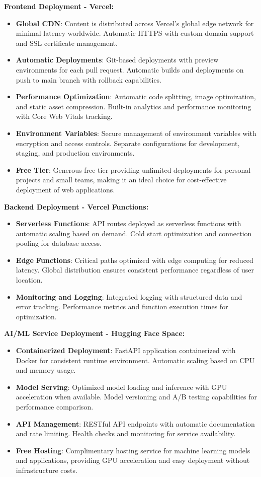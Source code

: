 \documentclass[12pt,a4paper]{article}
\begin{document}
\textbf{Frontend Deployment - Vercel:}
\begin{itemize}
  \item \textbf{Global CDN}: Content is distributed across Vercel's global edge network for minimal latency worldwide. Automatic HTTPS with custom domain support and SSL certificate management.
  \item \textbf{Automatic Deployments}: Git-based deployments with preview environments for each pull request. Automatic builds and deployments on push to main branch with rollback capabilities.
  \item \textbf{Performance Optimization}: Automatic code splitting, image optimization, and static asset compression. Built-in analytics and performance monitoring with Core Web Vitals tracking.
  \item \textbf{Environment Variables}: Secure management of environment variables with encryption and access controls. Separate configurations for development, staging, and production environments.
  \item \textbf{Free Tier}: Generous free tier providing unlimited deployments for personal projects and small teams, making it an ideal choice for cost-effective deployment of web applications.
\end{itemize}

\textbf{Backend Deployment - Vercel Functions:}
\begin{itemize}
  \item \textbf{Serverless Functions}: API routes deployed as serverless functions with automatic scaling based on demand. Cold start optimization and connection pooling for database access.
  \item \textbf{Edge Functions}: Critical paths optimized with edge computing for reduced latency. Global distribution ensures consistent performance regardless of user location.
  \item \textbf{Monitoring and Logging}: Integrated logging with structured data and error tracking. Performance metrics and function execution times for optimization.
\end{itemize}

\textbf{AI/ML Service Deployment - Hugging Face Space:}
\begin{itemize}
  \item \textbf{Containerized Deployment}: FastAPI application containerized with Docker for consistent runtime environment. Automatic scaling based on CPU and memory usage.
  \item \textbf{Model Serving}: Optimized model loading and inference with GPU acceleration when available. Model versioning and A/B testing capabilities for performance comparison.
  \item \textbf{API Management}: RESTful API endpoints with automatic documentation and rate limiting. Health checks and monitoring for service availability.
  \item \textbf{Free Hosting}: Complimentary hosting service for machine learning models and applications, providing GPU acceleration and easy deployment without infrastructure costs.
\end{itemize}
\end{document}
